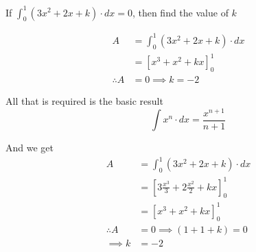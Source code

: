 \documentclass[14pt,fleqn]{extarticle}
\begin{document}
If $\int_0^1 (3x^2 + 2x + k)\cdot dx = 0$, then
find the value of $k$
%

\newcard

\begin{align}
	A &= \int_0^1 \left(3x^2 + 2x +k \right)\cdot dx \\
	&= \left[x^3+x^2 + kx \right]_0^1 \\
	\therefore A &= 0 \implies k = -2 
\end{align}

\newcard 

All that is required is the basic result \[\qquad \int x^n\cdot dx = \frac{x^{n+1}}{n+1}\] 

And we get 
\begin{align}
	A &= \int_0^1 \left(3x^2 + 2x +k \right)\cdot dx \\
	&= \left[3 \frac{x^3}{3} + 2 \frac{x^2}{2} + kx \right]_0^1 \\ 
	&= \left[x^3+x^2 + kx \right]_0^1 \\
	\therefore A &= 0 \implies \left(1+1+k \right) = 0 \\
	\implies k &= -2 
\end{align}
\end{document}
